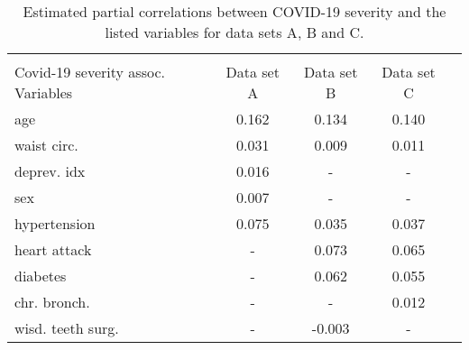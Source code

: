 

\begin{table}[ht]
  \begin{floatrow}
  \ttabbox
  {\caption{Estimated partial correlations between COVID-19 severity and the listed variables for data sets A, B and C.}\label{tab:covid_associations}}
  {\begin{tabular*}{\textwidth}{l @{\extracolsep{\fill}} cccc}
    \\[-1.8ex]\hline 
    \hline \\[-1.8ex]   
    Covid-19 severity assoc. Variables & Data set A & Data set B & Data set C\\
        \hline
        age				 & 0.162  & 0.134   &0.140\\
        waist circ.	     & 0.031  & 0.009	&0.011\\
        deprev. idx      & 0.016  & - 	& -	  \\
        sex				 & 0.007  &	 -      & -	  \\
        hypertension     & 0.075  & 0.035	&0.037\\
        heart attack     &  -     & 0.073   &0.065\\
        diabetes		 & -     & 0.062   &0.055\\
        chr. bronch.     & - &- &   0.012\\
        wisd. teeth surg.& - &  -0.003    & -\\
        \hline
  \end{tabular*}}%
  \end{floatrow}
\end{table}